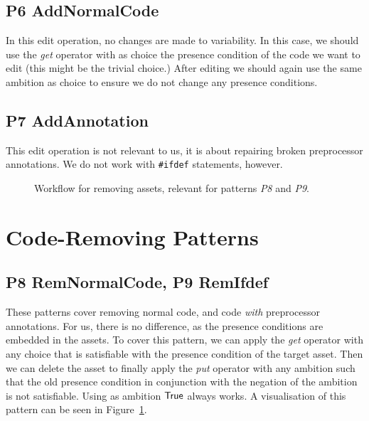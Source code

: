 \subsection*{P6 AddNormalCode}
In this edit operation, no changes are made to variability. In this case, we
should use the \emph{get} operator with as choice the presence condition of the
code we want to edit (this might be the trivial choice.) After editing we
should again use the same ambition as choice to ensure we do not change any
presence conditions.

\subsection*{P7 AddAnnotation}
This edit operation is not relevant to us, it is about repairing broken 
preprocessor annotations. We do not work with \texttt{\#ifdef} statements,
however.

\begin{figure}
  \centering
  \caption{Workflow for removing assets, relevant for patterns \emph{P8} and \emph{P9}.}
  \label{fig:patterns:p8}
\end{figure}

\section{Code-Removing Patterns}
\subsection*{P8 RemNormalCode, P9 RemIfdef}
These patterns cover removing normal code, and code \emph{with} preprocessor
annotations. For us, there is no difference, as the presence conditions are
embedded in the assets. To cover this pattern, we can apply the
\emph{get} operator with any choice that is satisfiable with the presence
condition of the target asset. Then we can delete the asset to finally apply
the \emph{put} operator with any ambition such that the old presence condition
in conjunction with the negation of the ambition is not satisfiable. Using as
ambition \({\sf True}\) always works. A visualisation of this pattern can be
seen in Figure~\ref{fig:patterns:p8}.

